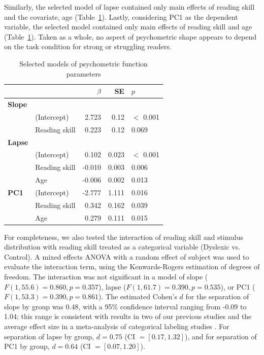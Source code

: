 \documentclass[../uwthesis.tex]{subfiles}
\begin{document}
Similarly, the selected model of lapse contained only main effects of reading skill and the covariate, age (Table~\ref{tab:psy_models}). Lastly, considering PC1 as the dependent variable, the selected model contained only main effects of reading skill and age (Table~\ref{tab:psy_models}). Taken as a whole, no aspect of psychometric shape appears to depend on the task condition for strong or struggling readers. 

\begin{table}[ht]
\centering
\caption{Selected models of psychometric function parameters}
\label{tab:psy_models}
\begin{tabular}{llrrl}
\toprule
  & & $\beta$ & SE & $p$\\
\midrule
\textbf{Slope} \\
& (Intercept) & 2.723 & 0.12 & $<$ 0.001\\
& Reading skill & 0.223 & 0.12 & 0.069\\
\midrule
\textbf{Lapse} \\
& (Intercept) & 0.102 & 0.023 & $<$ 0.001\\
& Reading skill & -0.010 & 0.003 & 0.006\\
& Age & -0.006 & 0.002 & 0.013\\
\midrule
\textbf{PC1}
&(Intercept) & -2.777 & 1.111 & 0.016\\
&Reading skill & 0.342 & 0.162 & 0.039\\
&Age & 0.279 & 0.111 & 0.015\\
\bottomrule
\end{tabular}
\end{table}




For completeness, we also tested the interaction of reading skill and stimulus distribution with reading skill treated as a categorical variable (Dyslexic vs. Control). A mixed effects ANOVA with a random effect of subject was used to evaluate the interaction term, using the Kenwards-Rogers estimation of degrees of freedom. The interaction was not significant in a model of slope ($F(1,55.6) = 0.860, p = 0.357$), lapse ($F(1,61.7)= 0.390, p = 0.535$), or PC1 ($F(1,53.3) = 0.390, p = 0.861$). The estimated Cohen’s $d$ for the separation of slope by group was 0.48, with a 95\% confidence interval ranging from -0.09 to 1.04; this range is consistent with results in two of our previous studies and the average effect size in a meta-analysis of categorical labeling studies \citep{OBrien2018,OBrien2019CategoricalDuration, Noordenbos2015}. For separation of lapse by group, $d=0.75$ (CI $= [0.17,1.32]$), and for separation of PC1 by group, $d=0.64$ (CI $= [0.07,1.20]$).
\end{document}
